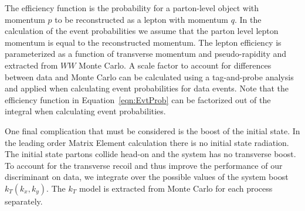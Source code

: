 The efficiency function is the probability for a parton-level object with momentum 
$p$ to be reconstructed as a lepton with momentum $q$. In the calculation of the event 
probabilities we assume that the parton level lepton momentum is equal to the reconstructed 
momentum. The lepton efficiency is parameterized as a function of transverse momentum and 
pseudo-rapidity and extracted from $WW$ Monte Carlo. 
A scale factor to account for
differences between data and Monte Carlo can be calculated using a tag-and-probe analysis 
and applied when calculating event probabilities for data events. 
Note that the efficiency function in Equation~\ref{eqn:EvtProb} can be factorized out of
the integral when calculating event probabilities.



One final complication that must be considered is the boost of the initial state.
In the leading order Matrix Element calculation there is no initial state radiation. 
The initial state partons collide head-on and the system has no transverse boost. 
To account for the transverse recoil and thus improve the performance of our discriminant
on data, we integrate over the possible values of the system boost $k_{T}(k_{x},k_{y})$. 
The $k_T$ model is extracted from Monte Carlo for each process separately. 


